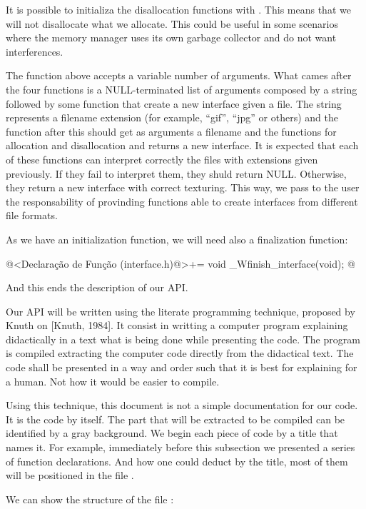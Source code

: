 It is possible to initializa the disallocation functions with
. This means that we will not disallocate what we
allocate. This could be useful in some scenarios where the memory
manager uses its own garbage collector and do not want interferences.

The function above accepts a variable number of arguments. What cames
after the four functions is a NULL-terminated list of arguments
composed by a string followed by some function that create a new
interface given a file. The string represents a filename extension
(for example, ``gif'', ``jpg'' or others) and the function after this
should get as arguments a filename and the functions for allocation
and disallocation and returns a new interface. It is expected that
each of these functions can interpret correctly the files with
extensions given previously. If they fail to interpret them, they
shuld return NULL. Otherwise, they return a new interface with correct
texturing. This way, we pass to the user the responsability of
provinding functions able to create interfaces from different file
formats.

As we have an initialization function, we will need also a
finalization function:

\iniciocodigo
@<Declaração de Função (interface.h)@>+=
void _Wfinish_interface(void);
@
\fimcodigo

And this ends the description of our API.


Our API will be written using the literate programming technique,
proposed by Knuth on [Knuth, 1984]. It consist in writting a computer
program explaining didactically in a text what is being done while
presenting the code. The program is compiled extracting the computer
code directly from the didactical text. The code shall be presented in
a way and order such that it is best for explaining for a human. Not
how it would be easier to compile.

Using this technique, this document is not a simple documentation for
our code. It is the code by itself. The part that will be extracted to
be compiled can be identified by a gray background. We begin each
piece of code by a title that names it. For example, immediately
before this subsection we presented a series of function
declarations. And how one could deduct by the title, most of them will
be positioned in the file .

We can show the structure of the file :

